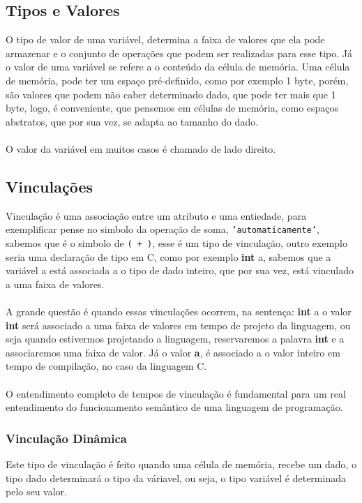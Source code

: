 \documentclass[12pt, onecolumn]{article}
\begin{document}
	\subsection{Tipos e Valores}
	O tipo de valor de uma variável, determina a faixa de valores que ela pode
	armazenar e o conjunto de operações que podem ser realizadas para esse tipo.
	Já o valor de uma variável se refere a o conteúdo da célula de memória. 
	Uma célula de memória, pode ter um espaço pré-definido, como por exemplo 
	1 byte, porém, são valores que podem não caber determinado dado, que pode 
	ter mais que 1 byte, logo, é conveniente, que pensemos em células de memória, 
	como espaços abstratos, que por sua vez, se adapta ao tamanho do dado.\\
	\\
	O valor da variável em muitos casos é chamado de lado direito.
	

	\subsection{Vinculações}
	Vinculação é uma associação entre um atributo e uma entiedade, para exemplificar
	pense no simbolo da operação de soma, \texttt{'automaticamente'}, sabemos que 
	é o simbolo de \texttt{( + )}, esse é um tipo de vinculação, outro exemplo seria
	uma declaração de tipo em C, como por exemplo \textbf{int} a, sabemos que a 
	variável a está associada a o tipo de dado inteiro, que por sua vez, está
	vinculado a uma faixa de valores.\\
	\\
	A grande questão é quando essas vinculações ocorrem, na sentença: \textbf{int} a
	o valor \textbf{int} será associado a uma faixa de valores em tempo de 
	projeto da linguagem, ou seja quando estivermos projetando a linguagem, 
	reservaremos a palavra \textbf{int} e a associaremos uma faixa de valor. 
	Já o valor \textbf{a}, é associado a o valor inteiro em tempo de compilação, 
	no caso da linguagem C.\\
	\\
	O entendimento completo de tempos de vinculação é fundamental para um real
	entendimento do funcionamento semântico de uma linguagem de programação.
	
		\subsubsection{\hspace{1cm}Vinculação Dinâmica}
	Este tipo de vinculação é feito quando uma célula de memória, recebe um dado,
	o tipo dado determinará o tipo da váriavel, ou seja, o tipo variável é 
	determinada pelo seu valor.
\end{document}
